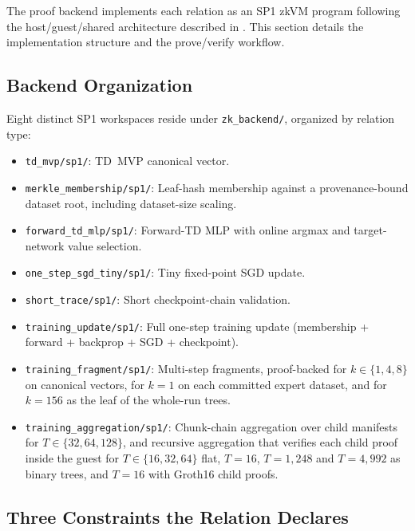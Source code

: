 
The proof backend implements each relation as an SP1 zkVM program following
the host/guest/shared architecture described in . This
section details the implementation structure and the prove/verify workflow.

\subsection{Backend Organization}

Eight distinct SP1 workspaces reside under \texttt{zk\_backend/}, organized
by relation type:

\begin{itemize}[leftmargin=1.5em]
  \item \texttt{td\_mvp/sp1/}: TD~MVP canonical vector.
  \item \texttt{merkle\_membership/sp1/}: Leaf-hash membership against a
  provenance-bound dataset root, including dataset-size scaling.
  \item \texttt{forward\_td\_mlp/sp1/}: Forward-TD MLP with online argmax and
  target-network value selection.
  \item \texttt{one\_step\_sgd\_tiny/sp1/}: Tiny fixed-point SGD update.
  \item \texttt{short\_trace/sp1/}: Short checkpoint-chain validation.
  \item \texttt{training\_update/sp1/}: Full one-step training update
  (membership + forward + backprop + SGD + checkpoint).
  \item \texttt{training\_fragment/sp1/}: Multi-step fragments, proof-backed
  for $k \in \{1, 4, 8\}$ on canonical vectors, for $k = 1$ on each committed
  expert dataset, and for $k = 156$ as the leaf of the whole-run trees.
  \item \texttt{training\_aggregation/sp1/}: Chunk-chain aggregation over
  child manifests for $T \in \{32, 64, 128\}$, and recursive aggregation that
  verifies each child proof inside the guest for $T \in \{16, 32, 64\}$ flat,
  $T = 16$, $T = 1{,}248$ and $T = 4{,}992$ as binary trees, and $T = 16$ with Groth16 child
  proofs.
\end{itemize}

\subsection{Three Constraints the Relation Declares}

